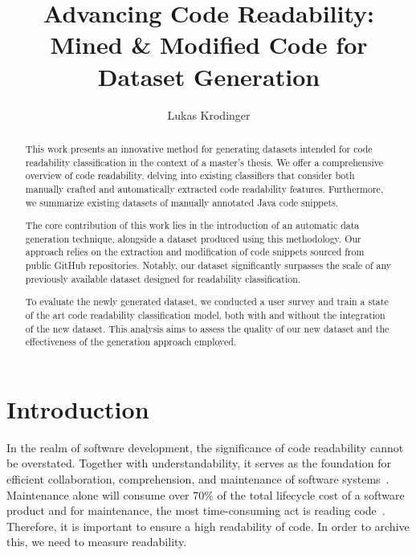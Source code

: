 \documentclass[%
class=scrreprt,
chapterprefix=false,%
open=right,%
twoside=false,%
paper=a4,%
logofile={Logo\_zentral\_farbig\_EN.png},%
thesistype=master,%
UKenglish,%
]{se2thesis}
\author{Lukas Krodinger}
\title{Advancing Code Readability: Mined \& Modified Code for Dataset Generation}
\institute{Chair of Software Engineering II}
\begin{document}
	
	\frontmatter
	
	\maketitle
	
	\begin{abstract}
		This work presents an innovative method for generating datasets intended for code readability classification in the context of a master's thesis. We offer a comprehensive overview of code readability, delving into existing classifiers that consider both manually crafted and automatically extracted code readability features. Furthermore, we summarize existing datasets of manually annotated Java code snippets.
		
		The core contribution of this work lies in the introduction of an automatic data generation technique, alongside a dataset produced using this methodology. Our approach relies on the extraction and modification of code snippets sourced from public GitHub repositories. Notably, our dataset significantly surpasses the scale of any previously available dataset designed for readability classification.
		
		To evaluate the newly generated dataset, we conducted a user survey and train a state of the art code readability classification model, both with and without the integration of the new dataset. This analysis aims to assess the quality of our new dataset and the effectiveness of the generation approach employed.

	\end{abstract}
	
	\mainmatter
	
	\tableofcontents
	
	\section{Introduction} \label{Introduction}
	In the realm of software development, the significance of code readability cannot be overstated. Together with understandability, it serves as the foundation for efficient collaboration, comprehension, and maintenance of software systems~\cite{posnett2011simpler, aggarwal2002integrated}. 
	Maintenance alone will consume over 70\% of the total lifecycle cost of a software product and for maintenance, the most time-consuming act is reading code~\cite{buse2009learning, deimel1985uses, rugaber2000use, boehm2001defect}.
	Therefore, it is important to ensure a high readability of code. In order to archive this, we need to measure readability.
	
\end{document}
